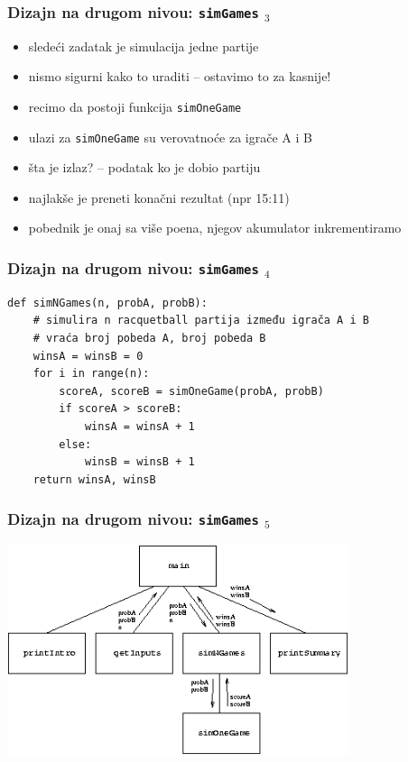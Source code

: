 \documentclass[utf8,compress,aspectratio=169]{beamer}
\begin{document}
\begin{frame}[fragile]
  \frametitle{Dizajn na drugom nivou: \texttt{simGames} $_3$}
  \begin{itemize}
    \item sledeći zadatak je simulacija jedne partije
    \item nismo sigurni kako to uraditi -- ostavimo to za kasnije!
    \item recimo da postoji funkcija \texttt{simOneGame}
    \item ulazi za \texttt{simOneGame} su verovatnoće za igrače A i B
    \item šta je izlaz? -- podatak ko je dobio partiju
    \item najlakše je preneti konačni rezultat (npr 15:11)
    \item pobednik je onaj sa više poena, njegov akumulator inkrementiramo
  \end{itemize}
\end{frame}

\begin{frame}[fragile]
  \frametitle{Dizajn na drugom nivou: \texttt{simGames} $_4$}
\begin{verbatim}
def simNGames(n, probA, probB):
    # simulira n racquetball partija između igrača A i B
    # vraća broj pobeda A, broj pobeda B
    winsA = winsB = 0
    for i in range(n):
        scoreA, scoreB = simOneGame(probA, probB)
        if scoreA > scoreB:
            winsA = winsA + 1
        else:
            winsB = winsB + 1
    return winsA, winsB
\end{verbatim}
\end{frame}

\begin{frame}[fragile]
  \frametitle{Dizajn na drugom nivou: \texttt{simGames} $_5$}
  \begin{center}
    \includegraphics[width=10cm]{pic23}
  \end{center}
\end{frame}
\end{document}
